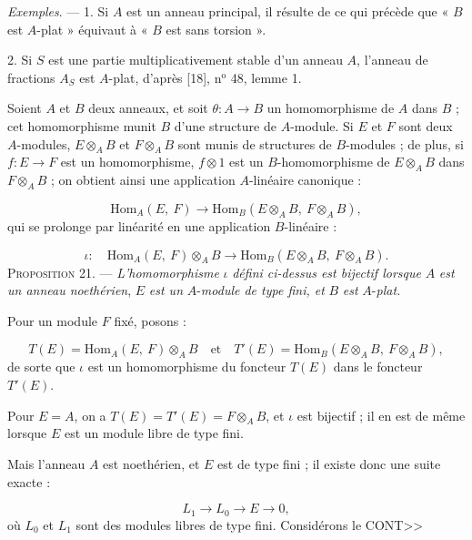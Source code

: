 \textit{Exemples}. --- 1. Si $A$ est un anneau principal, il résulte de ce qui précède que « $B$ est $A$-plat » équivaut à « $B$ est sans torsion ».

2. Si $S$ est une partie multiplicativement stable d'un anneau $A$, l'anneau de fractions $A_{S}$ est $A$-plat, d'après [18], n$^{\mathrm{o}}$ 48, lemme 1.

Soient $A$ et $B$ deux anneaux, et soit $\theta : A \to B$ un homomorphisme de $A$ dans $B$ ; cet homomorphisme munit $B$ d'une structure de $A$-module. Si $E$ et $F$ sont deux $A$-modules, $E \otimes_A B$ et $F \otimes_A B$ sont munis de structures de $B$-modules ; de plus, si $f : E \to F$ est un homomorphisme, $f \otimes 1$ est un $B$-homomorphisme de $E \otimes_A B$ dans $F \otimes_A B$ ; on obtient ainsi une application $A$-linéaire canonique :

\begin{equation*}
\mathrm{Hom}_A(E,\ F) \to \mathrm{Hom}_B(E \otimes_A B,\ F \otimes_A B),
\end{equation*}
qui se prolonge par linéarité en une application $B$-linéaire :

\begin{equation*}
\iota : \quad \mathrm{Hom}_A(E,\ F) \otimes_A B \to \mathrm{Hom}_B(E \otimes_A B,\ F \otimes_A B).
\end{equation*}
\textsc{Proposition} 21. --- \textit{L'homomorphisme} $\iota$ \textit{défini ci-dessus est bijectif lorsque} $A$ \textit{est un anneau noethérien}, $E$ \textit{est un} $A$-\textit{module de type fini, et} $B$ \textit{est} $A$-\textit{plat.}

Pour un module $F$ fixé, posons :

\begin{equation*}
T(E) = \mathrm{Hom}_A(E,\ F) \otimes_A B \quad \text{et} \quad T'(E) = \mathrm{Hom}_B(E \otimes_A B,\ F \otimes_A B),
\end{equation*}
de sorte que $\iota$ est un homomorphisme du foncteur $T(E)$ dans le foncteur $T'(E)$.

Pour $E = A$, on a $T(E) = T'(E) = F \otimes_A B$, et $\iota$ est bijectif ; il en est de même lorsque $E$ est un module libre de type fini.

Mais l'anneau $A$ est noethérien, et $E$ est de type fini ; il existe donc une suite exacte :

\begin{equation*}
L_1 \to L_0 \to E \to 0,
\end{equation*}
où $L_0$ et $L_1$ sont des modules libres de type fini. Considérons le CONT>>


